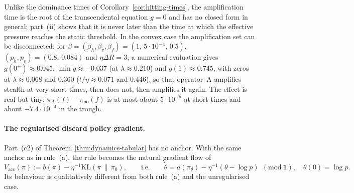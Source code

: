 \begin{remark}\label{rem:reentrance}
Unlike the dominance times of Corollary~\ref{cor:hitting-times}, the
amplification time is the root of the transcendental equation $g=0$ and
has no closed form in general; part~(ii) shows that it is never later than
the time at which the effective pressure reaches the static threshold. In
the convex case the amplification set can be disconnected: for
$\beta=(\beta_h,\beta_v,\beta_f)=(1,\,5\cdot10^{-4},\,0.5)$,
$(p_h,p_v)=(0.8,\,0.084)$ and $\eta\Delta R=3$, a numerical evaluation gives
$g(0^+)\approx0.045$, $\min g\approx-0.037$ (at $\lambda\approx0.210$) and $g(1)\approx0.745$, with zeros at $\lambda\approx0.068$ and $0.360$ ($t/\eta\approx0.071$ and $0.446$), so that
operator~A amplifies stealth at very short times, then does not, then
amplifies it again. The effect is real but tiny: $\pi_A(f)-\pi_{\mathrm{no}}(f)$ is at most about $5\cdot10^{-5}$ at short times and about $-7.4\cdot10^{-4}$ in the trough.
\end{remark}

\paragraph{The regularised discard policy gradient.}
Part~(c2) of Theorem~\ref{thm:dynamics-tabular} has no anchor. With the
same anchor as in rule~(a), the rule becomes the natural gradient flow of
\[
V_{\mathrm{acc}}(\pi):=b(\pi)-\eta^{-1}\mathrm{KL}(\pi\,\|\,\pi_0),
\qquad\text{i.e.}\qquad
\dot\theta=a(\pi_\theta)-\eta^{-1}(\theta-\log p)\ \ (\mathrm{mod}\ \mathbf 1),
\quad\theta(0)=\log p .
\]
Its behaviour is qualitatively different from both rule~(a) and the
unregularised case.

